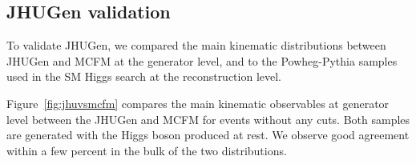\subsection{JHUGen validation}
\label{sec:JHUGenval}

To validate JHUGen, we compared the main kinematic distributions between JHUGen and
MCFM at the generator level, and to the Powheg-Pythia samples used in the
SM Higgs search at the reconstruction level.

Figure~\ref{fig:jhuvsmcfm} compares the main kinematic observables at generator 
level between the JHUGen and MCFM for events without any cuts. 
Both samples are generated with the Higgs boson produced at rest. 
We observe good agreement within a few percent in the bulk of the two distributions. 

